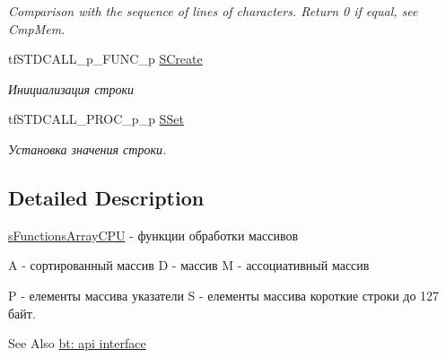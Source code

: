 \begin{DoxyCompactItemize}
\begin{DoxyCompactList}\small\item\em Comparison with the sequence of lines of characters. Return 0 if equal, see Cmp\-Mem. \end{DoxyCompactList}\item 
\hypertarget{structs_functions_array_c_p_u_add911505414cd0b1d15d15d0b337eb72}{tf\-S\-T\-D\-C\-A\-L\-L\-\_\-p\-\_\-\-F\-U\-N\-C\-\_\-p \hyperlink{structs_functions_array_c_p_u_add911505414cd0b1d15d15d0b337eb72}{S\-Create}}\label{structs_functions_array_c_p_u_add911505414cd0b1d15d15d0b337eb72}

\begin{DoxyCompactList}\small\item\em Инициализация строки \end{DoxyCompactList}\item 
\hypertarget{structs_functions_array_c_p_u_ae102789c49bca3e13ff63977d0428fd4}{tf\-S\-T\-D\-C\-A\-L\-L\-\_\-\-P\-R\-O\-C\-\_\-p\-\_\-p \hyperlink{structs_functions_array_c_p_u_ae102789c49bca3e13ff63977d0428fd4}{S\-Set}}\label{structs_functions_array_c_p_u_ae102789c49bca3e13ff63977d0428fd4}

\begin{DoxyCompactList}\small\item\em Установка значения строки. \end{DoxyCompactList}\end{DoxyCompactItemize}


\subsection{Detailed Description}
\hyperlink{structs_functions_array_c_p_u}{s\-Functions\-Array\-C\-P\-U} -\/ функции обработки массивов 

A -\/ сортированный массив D -\/ массив M -\/ ассоциативный массив

P -\/ елементы массива указатели S -\/ елементы массива короткие строки до 127 байт.

\begin{DoxySeeAlso}{See Also}
\hyperlink{group__apiinterface}{bt\-: api interface} 
\end{DoxySeeAlso}
